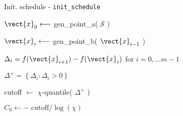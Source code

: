 \begin{algorithm}
\caption{Init. schedule - \texttt{init\_schedule}}\label{algo:init_sched}
\vspace{8pt}
\nosemic
\SetAlgoLined


$\vect{x}_0 \longleftarrow$ gen\_point\_a( $\mathcal{S}$ ) \;

 {
    $\vect{x}_i \longleftarrow $ gen\_point\_b( $\vect{x}_{i-1}$ ) \;
}

$\Delta_i = f(\vect{x}_{i+1}) - f(\vect{x}_i)$ for $i = 0,\ldots m-1$ \;

$\Delta^+ = \left\lbrace \Delta_i : \Delta_i > 0 \right\rbrace $ \;

cutoff $\longleftarrow$ $\chi$-quantile( $\Delta^+$ ) \;

$C_0 \longleftarrow -\text{ cutoff} / \log(\chi)$ \;

 \;


\end{algorithm}
